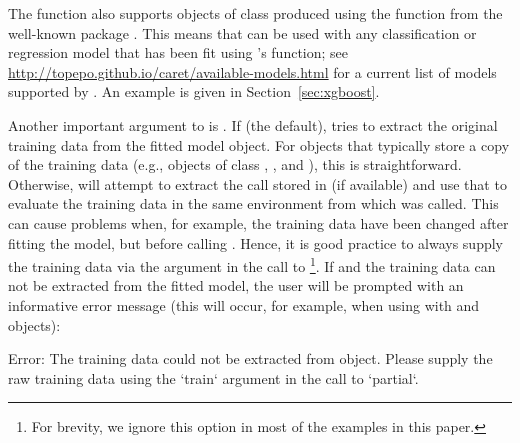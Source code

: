 The  function also supports objects of class  produced using the  function from the well-known  package \citep{caret-pkg}. This means that  can be used with any classification or regression model that has been fit using 's  function; see \url{http://topepo.github.io/caret/available-models.html} for a current list of models supported by . An example is given in Section~\ref{sec:xgboost}.

Another important argument to  is . If  (the default),  tries to extract the original training data from the fitted model object. For objects that typically store a copy of the training data (e.g., objects of class , , and ), this is straightforward. Otherwise,  will attempt to extract the call stored in  (if available) and use that to evaluate the training data in the same environment from which  was called. This can cause problems when, for example, the training data have been changed after fitting the model, but before calling . Hence, it is good practice to always supply the training data via the  argument in the call to \footnote{For brevity, we ignore this option in most of the examples in this paper.}. If  and the training data can not be extracted from the fitted model, the user will be prompted with an informative error message (this will occur, for example, when using  with  and  objects):
\begin{example}
Error: The training data could not be extracted from object. Please supply
the raw training data using the `train` argument in the call to `partial`.
\end{example}

